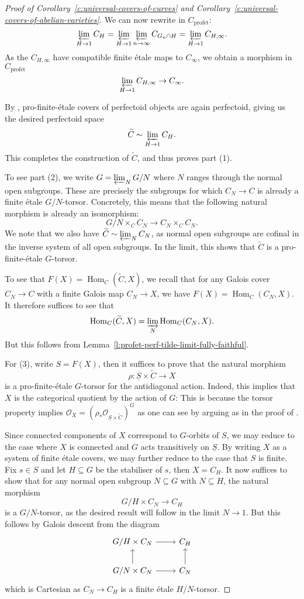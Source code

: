 \documentclass[10pt,oneside]{amsart}
\theoremstyle{definition}
\newcommand{\Hom}{\operatorname{Hom}}
\newcommand{\profet}{\operatorname{prof\acute{e}t}}
\renewcommand{\O}{\mathcal{O}}
\begin{document}
\begin{proof}[Proof of Corollary~\ref{c:universal-covers-of-curves} and Corollary~\ref{c:universal-covers-of-abelian-varieties}]
We can now rewrite in $C_{\profet}$:
\[\displaystyle\varprojlim_{H\rightarrow 1} C_H=\varprojlim_{H\rightarrow 1}\displaystyle\varprojlim_{n\rightarrow \infty} C_{G_n\cap H}=\varprojlim_{H\rightarrow 1}C_{H,\infty}.\]
As the $C_{H,\infty}$ have compatible finite \'etale maps to $C_\infty$, we obtain a morphism in $C_{\profet}$
\[\varprojlim_{H\rightarrow 1}C_{H,\infty}\rightarrow C_\infty.\]

By \cite[Lemma 4.6]{p-adic_Hodge}, pro-finite-\'etale covers of perfectoid objects are again perfectoid, giving us the desired perfectoid space 
\[ \widetilde{C}\sim\varprojlim_{H\rightarrow 1} C_H.\]
This completes the construction of $\widetilde{C}$, and thus proves part (1).

To see part (2), we write $G=\varprojlim_N G/N$ where $N$ ranges through the normal open subgroups. These are precisely the subgroups for which $C_N\to C$ is already a finite \'etale $G/N$-torsor. Concretely, this means that the following natural morphism is already an isomorphism:
\[G/N\times_C C_N\to C_N\times_CC_N.\]
We note that we also have $\widetilde{C} \sim \varprojlim_NC_N$, as normal open subgroups are cofinal in the inverse system of all open subgroups. In the limit, this shows that $\widetilde{C}$ is a pro-finite-\'etale $G$-torsor.

To see that $F(X)=\Hom_C(\widetilde{C},X)$, we recall that for any Galois cover $C_N\to C$ with a finite Galois map $C_N\to X$, we have $F(X)=\Hom_C(C_N,X)$. It therefore suffices to see that
\[\Hom_C(\widetilde{C},X)=\varinjlim_{N}\Hom_C(C_N,X).\]
But this follows from Lemma~\ref{l:profet-perf-tilde-limit-fully-faithful}.

For (3), write $S=F(X)$, then it suffices to prove that the natural morphism \[\rho:\underline{S}\times\widetilde{C}\to X\]
is a pro-finite-\'etale $G$-torsor for the antidiagonal action. Indeed, this implies that $X$ is the categorical quotient by the action of $G$: This is because the torsor property implies $\O_X = (\rho_{\ast}\O_{\underline{S}\times\widetilde{C}})^{G}$ as one can see by arguing as in the proof of \cite[Lemma 2.26]{CHJ}.

 Since connected components of $X$ correspond to $G$-orbits of $S$, we may reduce to the case where $X$ is connected and $G$ acts transitively on $\underline{S}$. By writing $X$ as a system of finite \'etale covers, we may further reduce to the case that $S$ is finite.  Fix $s\in S$ and let $H\subseteq G$ be the stabiliser of $s$, then $X=C_H$. It now suffices to show that for any normal open subgroup $N\subseteq G$ with $N\subseteq H$, the natural morphism
\[G/H\times C_N\to C_H\]
is a $G/N$-torsor, as the desired result will follow in the limit $N\to 1$. But this follows by Galois descent from the diagram
\[
\begin{tikzcd}
	G/H\times C_N \arrow[r]           & C_H           \\
	G/N \times C_N\arrow[r] \arrow[u] & C_N \arrow[u]
\end{tikzcd}
\]
which is Cartesian as $C_N\to C_H$ is a finite \'etale $H/N$-torsor.
\end{proof}
 



 

	
	
	
\end{document}
